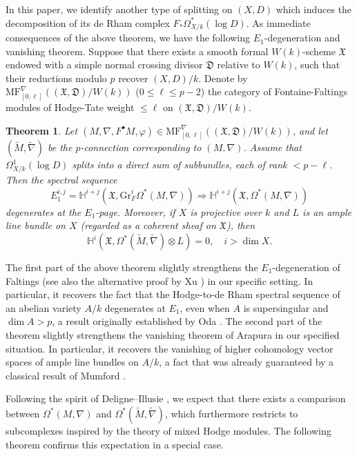 \documentclass[12pt, a4paper]{article}
\newtheorem{theorem}{Theorem}[section]
\begin{document}
In this paper, we identify another type of splitting on $(X,D)$ which induces the decomposition of its de Rham complex $F_*\Omega^*_{X/k}(\log D)$.
\fi
As immediate consequences of the above theorem, we have the following $E_1$-degeneration and vanishing theorem.\fi
Suppose that there exists a smooth formal $W(k)$-scheme $\mathfrak{X}$ endowed with a simple normal crossing divisor $\mathfrak{D}$ relative to $W(k)$, such that their reductions modulo $p$ recover $(X, D)/k$. Denote by $\mathrm{MF}^\nabla_{[0,\ell]}((\mathfrak X,\mathfrak D)/W(k))$ ($0\leq\ell\leq p-2$) the category of Fontaine-Faltings modules of Hodge-Tate weight $\leq\ell$ on $(\mathfrak X,\mathfrak D)/W(k)$.

\begin{theorem}
Let $(M, \nabla, F^\bullet M, \varphi) \in \mathrm{MF}^\nabla_{[0,\ell]}((\mathfrak{X}, \mathfrak{D})/W(k))$, and let $(\tilde{M}, \tilde{\nabla})$ be the $p$-connection corresponding to $(M, \nabla)$. Assume that $\Omega^1_{X/k}(\log D)$ splits into a direct sum of subbundles, each of rank $< p - \ell$. Then the spectral sequence
\[
E_1^{i,j} = \mathbb{H}^{i+j}(\mathfrak{X}, \mathrm{Gr}_F^i \Omega^*(M, \nabla)) \Rightarrow \mathbb{H}^{i+j}(\mathfrak{X}, \Omega^*(M, \nabla))
\]
degenerates at the $E_1$-page. Moreover, if $X$ is projective over $k$ and $L$ is an ample line bundle on $X$ (regarded as a coherent sheaf on $\mathfrak{X}$), then
\[
\mathbb{H}^i(\mathfrak{X}, \Omega^*(\tilde{M}, \tilde{\nabla}) \otimes L) = 0, \quad i > \dim X.
\]
\end{theorem}
The first part of the above theorem slightly strengthens the $E_1$-degeneration of Faltings \cite[Theorem 4.1$^*$]{Fa} (see also the alternative proof by Xu \cite{X}) in our specific setting. In particular, it recovers the fact that the Hodge-to-de Rham spectral sequence of an abelian variety $A/k$ degenerates at $E_1$, even when $A$ is supersingular and $\dim A > p$, a result originally established by Oda \cite{Oda}. The second part of the theorem slightly strengthens the vanishing theorem of Arapura \cite{Arapura} in our specified situation. In particular, it recovers the vanishing of higher cohomology vector spaces of ample line bundles on $A/k$, a fact that was already guaranteed by a classical result of Mumford \cite{Mumford}.

Following the spirit of Deligne–Illusie \cite{DI}, we expect that there exists a comparison between $\Omega^*(M, \nabla)$ and $\Omega^*(\tilde{M}, \tilde{\nabla})$, which furthermore restricts to subcomplexes inspired by the theory of mixed Hodge modules. The following theorem confirms this expectation in a special case.
\end{document}
